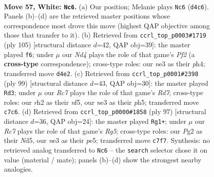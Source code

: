 \documentclass[11pt]{article}
\begin{document}
\clearpage

\begin{figure}[p]\centering
\begin{subfigure}{0.46\textwidth}\centering
\resizebox{\linewidth}{!}{%
\newchessgame
\chessboard[
  setfen={1r6/2R5/3p1k2/8/3N2pp/1p2n3/3R2Pr/6K1 w - - 4 57},
  showmover=false,
  pgfstyle=straightmove, color=movearrow, markmove={d4-c6}
]}
\caption{}
\end{subfigure}\hfill
\begin{subfigure}{0.46\textwidth}\centering
\resizebox{\linewidth}{!}{%
\newchessgame
\chessboard[
  setfen={8/4rp2/7k/6R1/r6P/4p1P1/1KP1R3/8 b - - 5 53},
  showmover=false,
  pgfstyle=straightmove, color=movearrow, markmove={f7-f6}
]}
\caption{}
\end{subfigure}
\\[4pt]
\begin{subfigure}{0.46\textwidth}\centering
\resizebox{\linewidth}{!}{%
\newchessgame
\chessboard[
  setfen={8/2r2p2/p1P2k2/2R2N1P/7P/P7/3r4/5K2 b - - 2 50},
  showmover=false,
  pgfstyle=straightmove, color=movearrow, markmove={d2-d3}
]}
\caption{}
\end{subfigure}\hfill
\begin{subfigure}{0.46\textwidth}\centering
\resizebox{\linewidth}{!}{%
\newchessgame
\chessboard[
  setfen={3r4/P4k2/8/3nP3/2p3r1/8/1P1R3p/R6K b - - 0 49},
  showmover=false,
  pgfstyle=straightmove, color=movearrow, markmove={g4-g1}
]}
\caption{}
\end{subfigure}
\caption{\textbf{Move 57, White: \texttt{Nc6}.} (a) Our position; Melanie plays \texttt{Nc6} (\texttt{d4c6}). Panels (b)--(d) are the retrieved master positions whose correspondence most drove this move (highest QAP objective among those that transfer to it). (b) Retrieved from \texttt{ccrl\_top\_p0003\#1719} (ply 105) [structural distance $d$=42, QAP obj=39]: the master played \texttt{f6}; under $\mu$ our \emph{Nd4} plays the role of that game's \emph{Pf2} (a \textbf{cross-type} correspondence); cross-type roles: our \emph{n}e3 as their \emph{p}h4; transferred move \texttt{d4e2}. (c) Retrieved from \texttt{ccrl\_top\_p0001\#2398} (ply 99) [structural distance $d$=43, QAP obj=30]: the master played \texttt{Rd3}; under $\mu$ our \emph{Rc7} plays the role of that game's \emph{Rd7}; cross-type roles: our \emph{r}h2 as their \emph{n}f5, our \emph{n}e3 as their \emph{p}h5; transferred move \texttt{c7c6}. (d) Retrieved from \texttt{ccrl\_top\_p0000\#1858} (ply 97) [structural distance $d$=36, QAP obj=24]: the master played \texttt{Rg1+}; under $\mu$ our \emph{Rc7} plays the role of that game's \emph{Rg5}; cross-type roles: our \emph{P}g2 as their \emph{N}d5, our \emph{n}e3 as their \emph{p}e5; transferred move \texttt{c7f7}. Synthesis: no retrieved analog transferred to \texttt{Nc6} -- the \texttt{search} selector chose it on value (material / mate); panels (b)--(d) show the strongest nearby analogies.}
\label{fig:thought-m112}
\end{figure}
\end{document}
